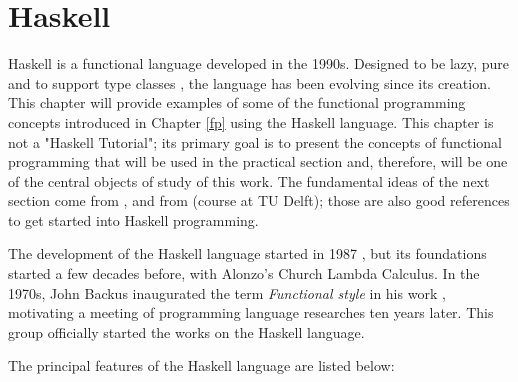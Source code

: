 \chapter{Haskell}
\label{haskell}

Haskell is a functional language developed in the 1990s. Designed to be lazy, pure and to support type classes \cite{hudak2007history}, the language has been evolving since its creation. This chapter will provide examples of some of the functional programming concepts introduced in Chapter \ref{fp} using the Haskell language. This chapter is not a "Haskell Tutorial"; its primary goal is to present the concepts of functional programming that will be used in the practical section and, therefore, will be one of the central objects of study of this work. The fundamental ideas of the next section come from \cite{hutton2016programming}, and from \cite{fp101em} (course at TU Delft); those are also good references to get started into Haskell programming.

The development of the Haskell language started in 1987 \cite{hudak2007history}, but its foundations started a few decades before, with Alonzo's Church Lambda Calculus. In the 1970s, John Backus inaugurated the term \textit{Functional style} in his work \cite{backus1978can}, motivating a meeting of programming language researches ten years later. This group officially started the works on the Haskell language.

The principal features of the Haskell language \cite{hutton2016programming} are listed below:

